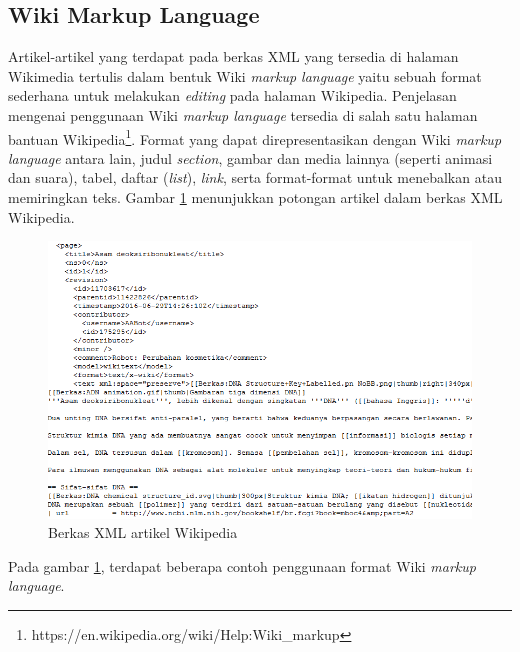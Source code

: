 \subsection{Wiki Markup Language}
Artikel-artikel yang terdapat pada berkas XML yang tersedia di halaman Wikimedia tertulis dalam bentuk Wiki \textit{markup language} yaitu sebuah format sederhana untuk melakukan \textit{editing} pada halaman Wikipedia. Penjelasan mengenai penggunaan Wiki \textit{markup language} tersedia di salah satu halaman bantuan Wikipedia\footnote{https://en.wikipedia.org/wiki/Help:Wiki\_markup}. Format yang dapat direpresentasikan dengan Wiki \textit{markup language} antara lain, judul \textit{section}, gambar dan media lainnya (seperti animasi dan suara), tabel, daftar (\textit{list}), \textit{link}, serta format-format untuk menebalkan atau memiringkan teks. Gambar \ref{fig:wiki-xml} menunjukkan potongan artikel dalam berkas XML Wikipedia.
\begin{figure}
	\centering
	\includegraphics[width=1\linewidth]{pics/wiki-xml}
	\caption{Berkas XML artikel Wikipedia}
	\label{fig:wiki-xml}
\end{figure}
\noindent Pada gambar \ref{fig:wiki-xml}, terdapat beberapa contoh penggunaan format Wiki \textit{markup language}.
